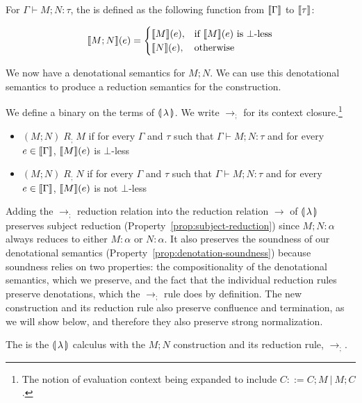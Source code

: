 \begin{definition}
  For $\Gamma \vdash M; N : \tau$, the 
  is defined as the following function from $\llbracket \Gamma \rrbracket$ to $\llbracket \tau \rrbracket$:

  $$
  \llbracket M; N \rrbracket(e) = \begin{cases}
    \llbracket M \rrbracket(e), & \text{if $\llbracket M \rrbracket(e)$ is $\bot$-less} \\
    \llbracket N \rrbracket(e), & \text{otherwise}
  \end{cases}
  $$
\end{definition}

We now have a denotational semantics for $M; N$. We can use this
denotational semantics to produce a reduction semantics for the
construction.

\begin{definition}\label{def:semi-reduction-rule}
  We define a binary  on the terms of
  $\llparenthesis \, \lambda \, \rrparenthesis$. We write $\to_;$ for its context
  closure.\footnote{The notion of evaluation context being expanded to
    include $C ::= C; M\ |\ M; C$.}
  
  \begin{itemize}
  \item $(M; N) \; R_; \; M$ if for every $\Gamma$ and $\tau$ such that
    $\Gamma \vdash M; N : \tau$ and for every $e \in \llbracket \Gamma \rrbracket$,
    $\llbracket M \rrbracket(e)$ is $\bot$-less
  \item $(M; N) \; R_; \; N$ if for every $\Gamma$ and $\tau$ such that
    $\Gamma \vdash M; N : \tau$ and for every $e \in \llbracket \Gamma \rrbracket$,
    $\llbracket M \rrbracket(e)$ is not $\bot$-less
  \end{itemize}
\end{definition}

Adding the $\to_;$ reduction relation into the reduction relation $\to$ of
$\llparenthesis \, \lambda \, \rrparenthesis$ preserves subject reduction
(Property~\ref{prop:subject-reduction}) since $M; N : \alpha$ always
reduces to either $M : \alpha$ or $N : \alpha$. It also preserves the
soundness of our denotational semantics
(Property~\ref{prop:denotation-soundness}) because soundness relies on two
properties: the compositionality of the denotational semantics, which we
preserve, and the fact that the individual reduction rules preserve
denotations, which the $\to_;$ rule does by definition. The new
construction and its reduction rule also preserve confluence and
termination, as we will show below, and therefore they also preserve strong
normalization.

\begin{notation}
  The  is the ${\llparenthesis \, \lambda \, \rrparenthesis}$ calculus with the $M; N$
  construction and its reduction rule, $\to_;$.
\end{notation}

